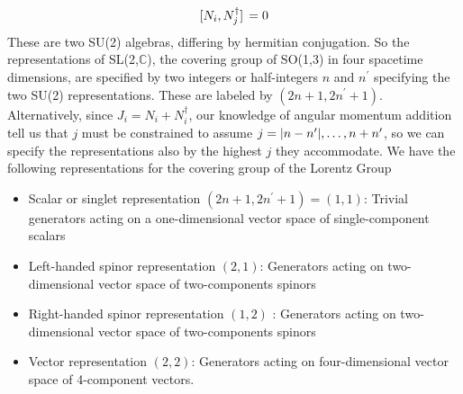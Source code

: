 \begin{equation}
    \comm*{N_i}{N_j^\dagger}=0
\end{equation}
These are two SU(2) algebras, differing by hermitian conjugation. So the representations of SL(2,$\mathbb{C}$), the covering group of SO(1,3) in four spacetime dimensions, are specified by two integers or half-integers $n$ and $n^\prime$ specifying the two SU(2) representations. These are labeled by $(2n+1,2n^\prime+1)$. Alternatively, since $J_i=N_i+N_i^\dagger$, our knowledge of angular momentum addition tell us that $j$ must be constrained to assume $j=\abs{n-n^\prime},\dots,n+n^\prime$, so we can specify the representations also by the highest $j$ they accommodate. We have the following representations for the covering group of the Lorentz Group
\begin{itemize}
    \item Scalar or singlet representation $(2n+1,2n^\prime+1)=(1,1)$: Trivial generators acting on a one-dimensional vector space of single-component scalars
    \item Left-handed spinor representation $(2,1)$: Generators acting on two-dimensional vector space of two-components spinors
    \item Right-handed spinor representation $(1,2)$ :
    Generators acting on two-dimensional vector space of two-components spinors
    \item Vector representation $(2,2)$:
    Generators acting on four-dimensional vector space of 4-component vectors.
\end{itemize}
